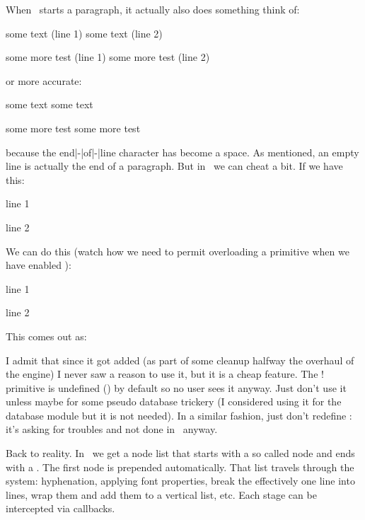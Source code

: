 When \TEX\ starts a paragraph, it actually also does something think of:

\starttyping[option=TEX]
[\the\everypar]some text      (line 1) some text      (line 2) \par
[\the\everypar]some more test (line 1) some more test (line 2) \par
\stoptyping

or more accurate:

\starttyping[option=TEX]
[\the\everypar]some text      some text      \par
[\the\everypar]some more test some more test \par
\stoptyping

because the end|-|of|-|line character has become a space. As mentioned,
an empty line is actually the end of a paragraph. But in \LUAMETATEX\
we can cheat a bit. If we have this:

\startbuffer
line 1

line 2
\stopbuffer

\typebuffer[option=TEX]

We can do this (watch how we need to permit overloading a primitive when we have
enabled \type {\overloadmode}):

\startbuffer
\pushoverloadmode
\def\linepar{\removeunwantedspaces !\ignorespaces}
\popoverloadmode
line 1

line 2
\stopbuffer

\typebuffer[option=TEX]

This comes out as:

\start \getbuffer \stop

I admit that since it got added (as part of some cleanup halfway the overhaul of
the engine) I never saw a reason to use it, but it is a cheap feature. The \type
{\linepar} primitive is undefined (\type {\undefined}) by default so no user sees
it anyway. Just don't use it unless maybe for some pseudo database trickery (I
considered using it for the database module but it is not needed). In a similar
fashion, just don't redefine \type {\par}: it's asking for troubles and \quote
{not done} in \CONTEXT\ anyway.

Back to reality. In \LUATEX\ we get a node list that starts with a so called
\type {localpar} node and ends with a \type {\parfillskip}. The first node is
prepended automatically. That list travels through the system: hyphenation,
applying font properties, break the effectively one line into lines, wrap them
and add them to a vertical list, etc. Each stage can be intercepted via
callbacks.

